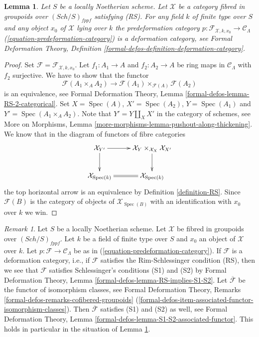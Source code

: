 \documentclass{stacks-project}
\theoremstyle{plain}
\newtheorem{lemma}[subsection]{Lemma}
\theoremstyle{definition}
\theoremstyle{remark}
\newtheorem{remark}[subsection]{Remark}
\numberwithin{equation}{subsection}
\def\Spec{\mathop{\mathrm{Spec}}}
\def\Sch{\mathit{Sch}}
\begin{document}
\begin{lemma}
\label{lemma-deformation-category}
Let $S$ be a locally Noetherian scheme. Let $\mathcal{X}$ be a category
fibred in groupoids over $(\Sch/S)_{fppf}$ satisfying (RS). For any field
$k$ of finite type over $S$ and any object $x_0$ of $\mathcal{X}$ lying
over $k$ the predeformation category
$p : \mathcal{F}_{\mathcal{X}, k, x_0} \to \mathcal{C}_\Lambda$
(\ref{equation-predeformation-category}) is a deformation category, see
Formal Deformation Theory, Definition
\ref{formal-defos-definition-deformation-category}.
\end{lemma}

\begin{proof}
Set $\mathcal{F} = \mathcal{F}_{\mathcal{X}, k, x_0}$.
Let $f_1 : A_1 \to A$ and $f_2 : A_2 \to A$ be ring maps in
$\mathcal{C}_\Lambda$ with $f_2$ surjective. We have to show that
the functor
$$
\mathcal{F}(A_1 \times_A A_2)
\longrightarrow
\mathcal{F}(A_1) \times_{\mathcal{F}(A)} \mathcal{F}(A_2)
$$
is an equivalence, see
Formal Deformation Theory, Lemma \ref{formal-defos-lemma-RS-2-categorical}.
Set $X = \Spec(A)$, $X' = \Spec(A_2)$, $Y = \Spec(A_1)$ and
$Y' = \Spec(A_1 \times_A A_2)$. Note that $Y' = Y \amalg_X X'$ in the
category of schemes, see
More on Morphisms, Lemma \ref{more-morphisms-lemma-pushout-along-thickening}.
We know that in the diagram of functors of fibre categories
$$
\xymatrix{
\mathcal{X}_{Y'} \ar[r] \ar[d] &
\mathcal{X}_Y \times_{\mathcal{X}_X} \mathcal{X}_{X'} \ar[d] \\
\mathcal{X}_{\Spec(k)} \ar@{=}[r] & \mathcal{X}_{\Spec(k)}
}
$$
the top horizontal arrow is an equivalence by
Definition \ref{definition-RS}.
Since $\mathcal{F}(B)$ is the category of objects of $\mathcal{X}_{\Spec(B)}$
with an identification with $x_0$ over $k$ we win.
\end{proof}

\begin{remark}
\label{remark-deformation-category-implies}
Let $S$ be a locally Noetherian scheme. Let $\mathcal{X}$ be fibred
in groupoids over $(\Sch/S)_{fppf}$. Let $k$ be a field of finite type over
$S$ and $x_0$ an object
of $\mathcal{X}$ over $k$. Let $p : \mathcal{F} \to \mathcal{C}_\Lambda$
be as in (\ref{equation-predeformation-category}). If $\mathcal{F}$
is a deformation category, i.e., if $\mathcal{F}$ satisfies the
Rim-Schlessinger condition (RS), then we see that $\mathcal{F}$ satisfies
Schlessinger's conditions (S1) and (S2) by
Formal Deformation Theory, Lemma \ref{formal-defos-lemma-RS-implies-S1-S2}.
Let $\overline{\mathcal{F}}$ be the functor of isomorphism classes, see
Formal Deformation Theory, Remarks
\ref{formal-defos-remarks-cofibered-groupoids}
(\ref{formal-defos-item-associated-functor-isomorphism-classes}).
Then $\overline{\mathcal{F}}$ satisfies (S1) and (S2) as well, see
Formal Deformation Theory, Lemma
\ref{formal-defos-lemma-S1-S2-associated-functor}.
This holds in particular in the situation of
Lemma \ref{lemma-deformation-category}.
\end{remark}
\end{document}
